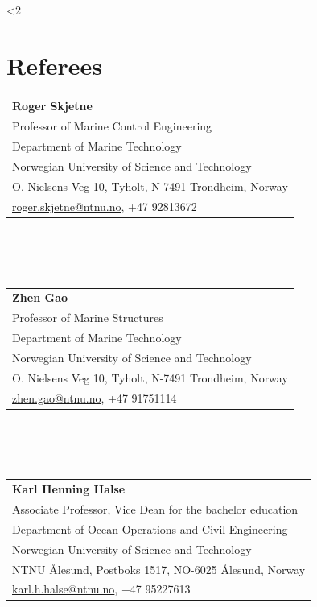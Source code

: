 \documentclass[10pt]{ctexart}
\begin{document}
\newpage
\ifnum\value{num}<2 {
    \section*{\textbf{Referees}}
    	\begin{tabular}{@{}l@{}}
    	\textbf{Roger Skjetne}\\
    	Professor of Marine Control Engineering\\
    	Department of Marine Technology\\
        Norwegian University of Science and Technology\\
        O. Nielsens Veg 10, Tyholt, N-7491 Trondheim, Norway \\
        \url{roger.skjetne@ntnu.no}, +47 92813672
        \end{tabular}\\
        \\ \\
        \begin{tabular}{@{}l@{}}
        \textbf{Zhen Gao}\\
        Professor of Marine Structures\\
    	Department of Marine Technology\\
        Norwegian University of Science and Technology\\
        O. Nielsens Veg 10, Tyholt, N-7491 Trondheim, Norway\\
        \url{zhen.gao@ntnu.no}, +47 91751114
        \end{tabular}\\
      \\ \\
        \begin{tabular}{@{}l@{}}
        \textbf{Karl Henning Halse}\\
        Associate Professor, Vice Dean for the bachelor education\\
    	Department of Ocean Operations and Civil Engineering\\
        Norwegian University of Science and Technology\\
        NTNU {\AA}lesund, Postboks 1517, NO-6025 {\AA}lesund, Norway\\
        \url{karl.h.halse@ntnu.no}, +47 95227613
        \end{tabular}\\
}
\end{document}
